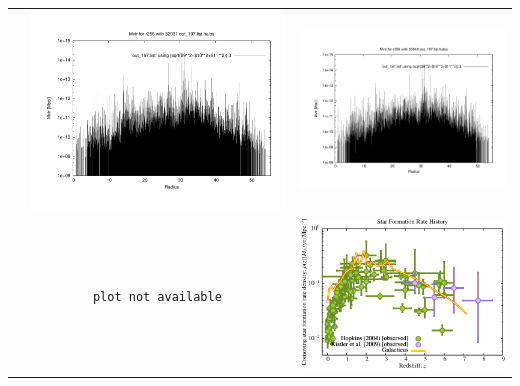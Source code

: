 \begin{itemize}
\begin{table}[p]
\begin{tabular}{l|c|c}
 & \includegraphics[scale=0.25]{r256/h70/rst14lg3/plot_mvir_out_197.pdf} & \includegraphics[scale=0.25]{r256/h100/rst14lg3/plot_mvir_out_197.pdf} \\
 & \texttt{plot not available} & \includegraphics[scale=0.5]{r256/h100/rst14lg3/Plot_Star_Formation_History.pdf} \\

\end{tabular}
\end{table}
\end{itemize}
